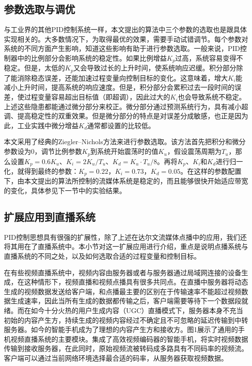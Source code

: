 \subsection{参数选取与调优}

与工业界的其他PID控制系统一样，本文提出的算法中三个参数的选取也是跟具体实现相关的。大多数情况下，为取得最优的效果，需要手动试错调节。每个参数对系统的不同方面产生影响，知道这些影响有助于进行参数选取。一般来说，PID控制器中的比例部分会影响系统的稳定性。如果比例增益$K_p$过高，系统容易变得不稳定。但是，太低的$K_p$又会导致过长的上升时间，使系统响应迟缓。积分部分除了能消除稳态误差，还能加速过程变量向控制目标的变化。这意味着，增大$K_i$能减小上升时间，提高系统的响应速度。但是，积分部分会累积过去一段时间的误差，使过程变量容易超出目标值（即超调），因此过大的$K_i$也会导致系统不稳定。上述这些隐患都能通过微分部分来校正。微分部分通过预测系统行为，具有减小超调、提高稳定性的双重效果。但是微分部分的特点是对误差分成敏感，也正是因为此，工业实践中微分增益$K_d$通常都设置的比较低。

本文采用了经典的Ziegler--Nichols方法\supercite{Ziegler1942}来进行参数选取。该方法首先把积分和微分参数设为0，调节比例参数$K_p$到系统开始震荡时的值$K_u$，假设震荡周期为$T_u$，那么设置$K_p = 0.6K_u$、$K_i = 2K_u/T_u$、$K_d = K_u \cdot T_u/8$。再将$K_p$、$K_i$和$K_d$进行归一化，就得到最终的参数：$K_p = 0.22$，$K_i = 0.73$，$K_d = 0.05$。在这样的参数配置下，由本文提出的算法所控制的流媒体系统是稳定的，而且能够很快开始适应带宽的变化，具体参见下一节中的实验结果。

\subsection{扩展应用到直播系统}

PID控制思想具有很强的扩展性，除了上述在达尔文流媒体点播中的应用，我们还将其用在了直播系统中。本小节对这一扩展应用进行介绍，重点是说明点播系统与直播系统的不同之处，以及如何选取合适的过程变量和控制目标。

在有些视频直播系统中，视频内容由服务器或者与服务器通过局域网连接的设备生成，在这种情形下，视频直播和视频点播具有很多共同点。在直播中服务器将动态生成的视频数据发送给客户端，和点播最主要的区别在于传输速率不能超过视频数据生成速率，因此当所有生成的数据都传输之后，客户端需要等待下一个数据段就绪\supercite{Thang2014}。而在如今十分火热的用户生成内容（UGC）直播模式下，服务器本身不充当初始的内容产生方，持续生成的视频内容经过不确定且不可忽略的延迟传输到中转服务器。如今的智能手机成为了理想的内容产生方和接收方。图1展示了通用的手机视频直播系统的主要模块。集成了高效视频编码器的智能手机，将实时视频数据传输到接收服务器，在此同时，原始视频流被转码成多路具有不同码率的视频流。客户端可以通过当前网络环境选择最合适的码率，从服务器获取视频数据。

